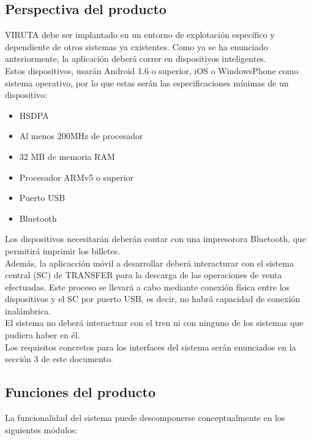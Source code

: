 \subsection{Perspectiva del producto}

VIRUTA debe ser implantado en un entorno de explotación específico y dependiente de otros sistemas ya existentes. Como ya se ha enunciado anteriormente, la aplicación deberá correr en dispositivos inteligentes.\\

Estos dispositivos, usarán Android 1.6 o superior, iOS o WindowsPhone como sistema operativo, por lo que estas serán las especificaciones mínimas de un dispositivo:

\begin{itemize}
\item HSDPA
\item Al menos 200MHz de procesador
\item 32 MB de memoria RAM
\item Procesador ARMv5 o superior 
\item Puerto USB
\item Bluetooth
\end{itemize}

Los dispositivos necesitarán deberán contar con una impresorora Bluetooth, que permitirá imprimir los billetes.\\

Además, la aplicacción móvil a desarrollar deberá interacturar con el sistema central (SC) de TRANSFER para la descarga de las operaciones de venta efectuadas. Este proceso se llevará a cabo mediante conexión física entre los dispositivos y el SC por puerto USB, es decir, no habrá capacidad de conexión inalámbrica.\\

El sistema no deberá interactuar con el tren ni con ninguno de los sistemas que pudiera haber en él.\\

Los requisitos concretos para los interfaces del sistema serán enunciados en la sección 3 de este documento.


\subsection{Funciones del producto}

La funcionalidad del sistema puede descomponerse conceptualmente en los siguientes módulos:

